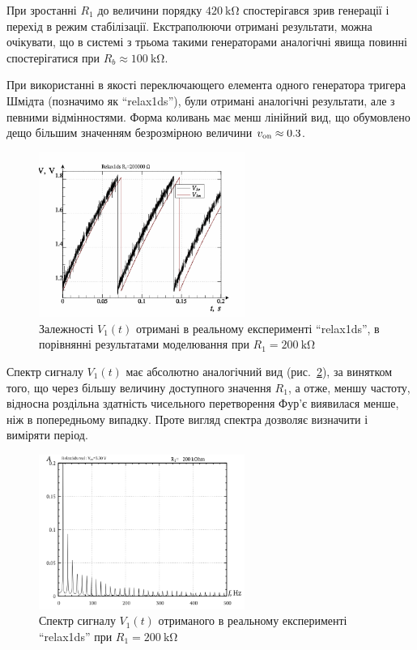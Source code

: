 При зростанні
$ R_1 $ до величини порядку
$ \SI{420}{\kilo \ohm} $ спостерігався зрив генерації і перехід в
режим стабілізації. Екстраполюючи отримані результати, можна
очікувати, що в системі з трьома такими генераторами аналогічні
явища повинні спостерігатися при
$ R_b \approx \SI{100}{\kilo \ohm} $.

При використанні в якості переключающего елемента одного
генератора тригера Шмідта (позначимо як ``relax1ds''), були отримані
аналогічні результати, але з певними відмінностями. Форма
коливань має менш лінійний вид, що обумовлено дещо більшим
значенням безрозмірною величини
$ v _\mathrm{on} \approx 0.3 $.

\begin{figure}[htb!]
  \centerline{\includegraphics[width=0.6\textwidth]{p/relax1ds_read_cmp-p_t_r1=200k.png} }
\caption{Залежності $ V_1 (t) $ отримані в реальному експерименті ``relax1ds'', в порівнянні результатами моделювання при $ R_1 = \SI{200}{\kilo \ohm} $}
\label{atu:f:relax1ds_read_cmp-p_t_r1}
\end{figure}

Спектр сигналу
$V_1(t) $ має абсолютно аналогічний вид (рис.~\ref{atu:f:relax1ds_f_r1}), за
винятком того, що через більшу величину доступного значення
$R_1$, а отже, меншу частоту, відносна роздільна здатність
чисельного перетворення Фур'є виявилася менше, ніж в
попередньому випадку. Проте вигляд спектра дозволяє визначити
і виміряти період.

\begin{figure}[htb!]
  \centerline{\includegraphics[width=0.6\textwidth]{p/relax1ds_f_200000.png} }
\caption{Спектр сигналу $ V_1 (t) $ отриманого в реальному експерименті ``relax1ds'' при $ R_1 = \SI{200}{\kilo \ohm} $}
  \label{atu:f:relax1ds_f_r1}
\end{figure}

